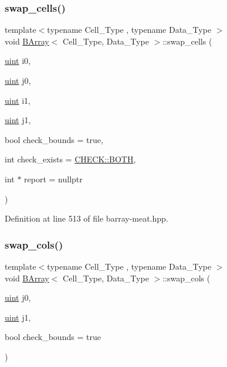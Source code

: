 \mbox{\label{group__barray-insert_gafb7976f67770b850922c1a7e1d6b07cc}} 
\subsubsection{\texorpdfstring{swap\+\_\+cells()}{swap\_cells()}}
{\footnotesize\ttfamily template$<$typename Cell\+\_\+\+Type , typename Data\+\_\+\+Type $>$ \\
void \hyperlink{class_b_array}{B\+Array}$<$ Cell\+\_\+\+Type, Data\+\_\+\+Type $>$\+::swap\+\_\+cells (\begin{DoxyParamCaption}\item[{\hyperlink{typedefs_8hpp_a91ad9478d81a7aaf2593e8d9c3d06a14}{uint}}]{i0,  }\item[{\hyperlink{typedefs_8hpp_a91ad9478d81a7aaf2593e8d9c3d06a14}{uint}}]{j0,  }\item[{\hyperlink{typedefs_8hpp_a91ad9478d81a7aaf2593e8d9c3d06a14}{uint}}]{i1,  }\item[{\hyperlink{typedefs_8hpp_a91ad9478d81a7aaf2593e8d9c3d06a14}{uint}}]{j1,  }\item[{bool}]{check\+\_\+bounds = {\ttfamily true},  }\item[{int}]{check\+\_\+exists = {\ttfamily \hyperlink{namespace_c_h_e_c_k_a3acda1c74bfabb5b6b67e19d0ad2d52a}{C\+H\+E\+C\+K\+::\+B\+O\+TH}},  }\item[{int $\ast$}]{report = {\ttfamily nullptr} }\end{DoxyParamCaption})\hspace{0.3cm}{\ttfamily [inline]}}



Definition at line 513 of file barray-\/meat.\+hpp.

\mbox{\label{group__barray-insert_gae94f7e61ca5985244968d9daf2859229}} 
\subsubsection{\texorpdfstring{swap\+\_\+cols()}{swap\_cols()}}
{\footnotesize\ttfamily template$<$typename Cell\+\_\+\+Type , typename Data\+\_\+\+Type $>$ \\
void \hyperlink{class_b_array}{B\+Array}$<$ Cell\+\_\+\+Type, Data\+\_\+\+Type $>$\+::swap\+\_\+cols (\begin{DoxyParamCaption}\item[{\hyperlink{typedefs_8hpp_a91ad9478d81a7aaf2593e8d9c3d06a14}{uint}}]{j0,  }\item[{\hyperlink{typedefs_8hpp_a91ad9478d81a7aaf2593e8d9c3d06a14}{uint}}]{j1,  }\item[{bool}]{check\+\_\+bounds = {\ttfamily true} }\end{DoxyParamCaption})\hspace{0.3cm}{\ttfamily [inline]}}



